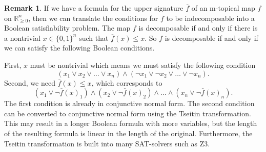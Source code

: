 \documentclass[10pt,reqno]{amsart}
\newcommand{\R}{\mathbb{R}}
\theoremstyle{plain}
\newtheorem{theorem}{Theorem}[section]
\theoremstyle{definition}
\newtheorem{remark}[theorem]{Remark}
\numberwithin{equation}{section}
\begin{document}
\begin{remark}
If we have a formula for the upper signature $\overline{f}$ of an m-topical map $f$ on $\R^n_{\ge 0}$, then we can translate the conditions for $f$ to be indecomposable into a Boolean satisfiability problem.  The map $f$ is decomposable if and only if there is a nontrivial $x \in \{0,1\}^n$ such that $\overline{f}(x) \le x$.  So $f$ is decomposable if and only if we can satisfy the following Boolean conditions.  

First, $x$ must be nontrivial which means we must satisfy the following condition
$$(x_1 \vee x_2 \vee \ldots \vee x_n) \wedge (\neg x_1 \vee \neg x_2 \vee \ldots \vee \neg x_n).$$
Second, we need $\overline{f}(x) \le x$, which corresponds to
$$(x_1 \vee \neg \overline{f}(x)_1) \wedge (x_2 \vee \neg \overline{f}(x)_2) \wedge \ldots \wedge (x_n \vee \neg \overline{f}(x)_n).$$
The first condition is already in conjunctive normal form.  The second condition can be converted to conjunctive normal form using the Tseitin transformation.  This may result in a longer Boolean formula with more variables, but the length of the resulting formula is linear in the length of the original.  Furthermore, the Tseitin transformation is built into many SAT-solvers such as Z3.  
\end{remark}

%
%
\end{document}
